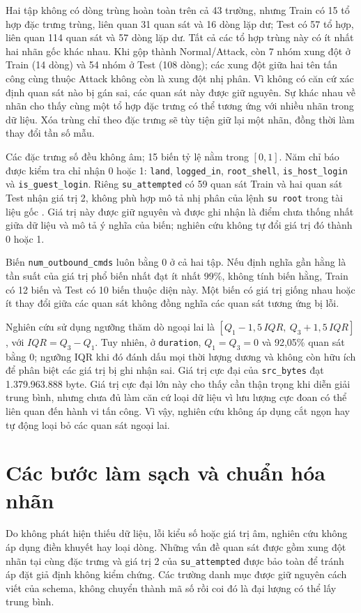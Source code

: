 Hai tập không có dòng trùng hoàn toàn trên cả 43 trường, nhưng Train có 15 tổ hợp đặc trưng trùng, liên quan 31 quan sát và 16 dòng lặp dư; Test có 57 tổ hợp, liên quan 114 quan sát và 57 dòng lặp dư. Tất cả các tổ hợp trùng này có ít nhất hai nhãn gốc khác nhau. Khi gộp thành Normal/Attack, còn 7 nhóm xung đột ở Train (14 dòng) và 54 nhóm ở Test (108 dòng); các xung đột giữa hai tên tấn công cùng thuộc Attack không còn là xung đột nhị phân. Vì không có căn cứ xác định quan sát nào bị gán sai, các quan sát này được giữ nguyên. Sự khác nhau về nhãn cho thấy cùng một tổ hợp đặc trưng có thể tương ứng với nhiều nhãn trong dữ liệu. Xóa trùng chỉ theo đặc trưng sẽ tùy tiện giữ lại một nhãn, đồng thời làm thay đổi tần số mẫu.

Các đặc trưng số đều không âm; 15 biến tỷ lệ nằm trong $[0,1]$. Năm chỉ báo được kiểm tra chỉ nhận 0 hoặc 1: \texttt{land}, \texttt{logged\_in}, \texttt{root\_shell}, \texttt{is\_host\_login} và \texttt{is\_guest\_login}. Riêng \texttt{su\_attempted} có 59 quan sát Train và hai quan sát Test nhận giá trị 2, không phù hợp mô tả nhị phân của lệnh \texttt{su root} trong tài liệu gốc \cite{task2_kdd1999}. Giá trị này được giữ nguyên và được ghi nhận là điểm chưa thống nhất giữa dữ liệu và mô tả ý nghĩa của biến; nghiên cứu không tự đổi giá trị đó thành 0 hoặc 1.

Biến \texttt{num\_outbound\_cmds} luôn bằng 0 ở cả hai tập. Nếu định nghĩa gần hằng là tần suất của giá trị phổ biến nhất đạt ít nhất 99\%, không tính biến hằng, Train có 12 biến và Test có 10 biến thuộc diện này. Một biến có giá trị giống nhau hoặc ít thay đổi giữa các quan sát không đồng nghĩa các quan sát tương ứng bị lỗi.

Nghiên cứu sử dụng ngưỡng thăm dò ngoại lai là $[Q_1-1{,}5\,IQR,\ Q_3+1{,}5\,IQR]$, với $IQR=Q_3-Q_1$. Tuy nhiên, ở \texttt{duration}, $Q_1=Q_3=0$ và 92,05\% quan sát bằng 0; ngưỡng IQR khi đó đánh dấu mọi thời lượng dương và không còn hữu ích để phân biệt các giá trị bị ghi nhận sai. Giá trị cực đại của \texttt{src\_bytes} đạt 1.379.963.888 byte. Giá trị cực đại lớn này cho thấy cần thận trọng khi diễn giải trung bình, nhưng chưa đủ làm căn cứ loại dữ liệu vì lưu lượng cực đoan có thể liên quan đến hành vi tấn công. Vì vậy, nghiên cứu không áp dụng cắt ngọn hay tự động loại bỏ các quan sát ngoại lai.

\section{Các bước làm sạch và chuẩn hóa nhãn}
Do không phát hiện thiếu dữ liệu, lỗi kiểu số hoặc giá trị âm, nghiên cứu không áp dụng điền khuyết hay loại dòng. Những vấn đề quan sát được gồm xung đột nhãn tại cùng đặc trưng và giá trị 2 của \texttt{su\_attempted} được bảo toàn để tránh áp đặt giả định không kiểm chứng. Các trường danh mục được giữ nguyên cách viết của schema, không chuyển thành mã số rồi coi đó là đại lượng có thể lấy trung bình.

